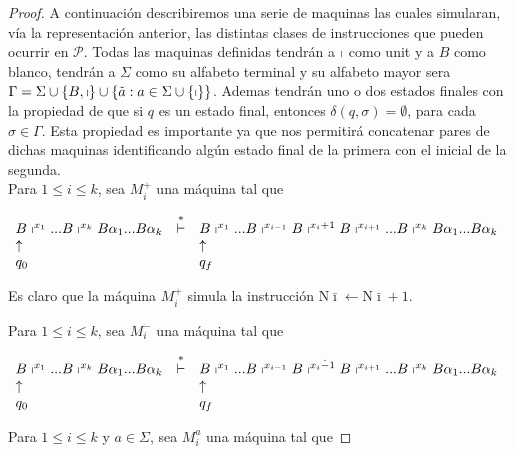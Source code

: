 \begin{lemma}
\begin{proof}
    A continuación describiremos una serie de maquinas las cuales simularan, vía la representación anterior, las
    distintas clases de instrucciones que pueden ocurrir en $\mathcal{P}$. Todas las maquinas definidas tendrán a
    $\shortmid $ como unit y a $B$ como blanco, tendrán a $\Sigma $ como su alfabeto terminal y su alfabeto mayor sera
    $\Gamma =\Sigma \cup \{B,\shortmid \}\cup \{\tilde{a }:a\in \Sigma \cup \{\shortmid \}\}$. Ademas tendrán uno o dos
    estados finales con la propiedad de que si $q$ es un estado final, entonces $\delta (q,\sigma )=\emptyset $, para cada $\sigma \in \Gamma $. Esta propiedad es importante ya que nos permitirá concatenar pares de dichas maquinas identificando algún estado final de la primera con el inicial de la segunda. \\

		\noindent Para $1\leq i\leq k$, sea $M_{i}^{+}$ una máquina tal que

		\bigskip

    $\displaystyle \begin{array}{lcl} B\shortmid ^{x_{1}}...B\shortmid ^{x_{k}}B\alpha _{1}...B\alpha _{k} &
    \overset{\ast }{\vdash } & B\shortmid ^{x_{1}}...B\shortmid ^{x_{i-1}}B\shortmid ^{x_{i}+1}B\shortmid
    ^{x_{i+1}}...B\shortmid ^{x_{k}}B\alpha _{1}...B\alpha _{k} \\ \uparrow & & \uparrow \\ q_{0} & & q_{f} \end{array} $

    Es claro que la máquina $M_{i}^{+}$ simula la instrucción $\mathrm{N}\bar{ \imath}\leftarrow \mathrm{N}\bar{\imath}+1$.

    \noindent Para $1\leq i\leq k$, sea $M_{i}^{\dot{-}}$ una máquina tal que

		\bigskip

    $\displaystyle \begin{array}{lcl} B\shortmid ^{x_{1}}...B\shortmid ^{x_{k}}B\alpha _{1}...B\alpha _{k} &
    \overset{\ast }{\vdash } & B\shortmid ^{x_{1}}...B\shortmid ^{x_{i-1}}B\shortmid ^{x_{i}\dot{-}1}B\shortmid
    ^{x_{i+1}}...B\shortmid ^{x_{k}}B\alpha _{1}...B\alpha _{k} \\ \uparrow & & \uparrow \\ q_{0} & & q_{f} \end{array} $

		\bigskip


    \noindent Para $1\leq i\leq k$ y $a\in \Sigma $, sea $M_{i}^{a}$ una máquina tal que


\end{proof}
\end{lemma}
